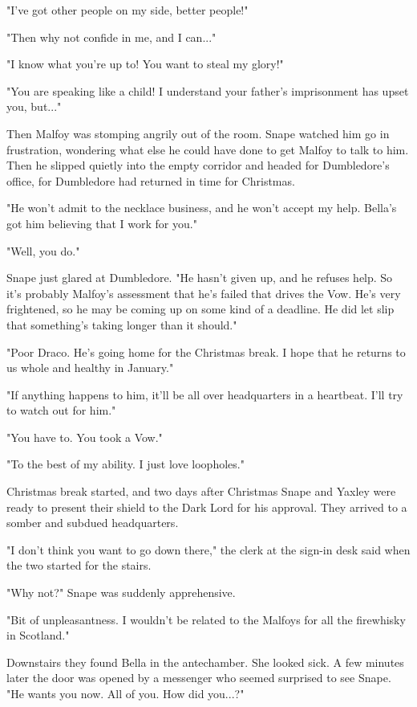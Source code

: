 \documentclass[a4paper,11pt]{article}
\begin{document}
"I've got other people on my side, better people!"

"Then why not confide in me, and I can..."

"I know what you're up to! You want to steal my glory!"

"You are speaking like a child! I understand your father's imprisonment has upset you, but..."

Then Malfoy was stomping angrily out of the room. Snape watched him go in frustration, wondering what else he could have done to get Malfoy to talk to him. Then he slipped quietly into the empty corridor and headed for Dumbledore's office, for Dumbledore had returned in time for Christmas.

"He won't admit to the necklace business, and he won't accept my help. Bella's got him believing that I work for you."

"Well, you do."

Snape just glared at Dumbledore. "He hasn't given up, and he refuses help. So it's probably Malfoy's assessment that he's failed that drives the Vow. He's very frightened, so he may be coming up on some kind of a deadline. He did let slip that something's taking longer than it should."

"Poor Draco. He's going home for the Christmas break. I hope that he returns to us whole and healthy in January."

"If anything happens to him, it'll be all over headquarters in a heartbeat. I'll try to watch out for him."

"You have to. You took a Vow."

"To the best of my ability. I just love loopholes."

Christmas break started, and two days after Christmas Snape and Yaxley were ready to present their shield to the Dark Lord for his approval. They arrived to a somber and subdued headquarters.

"I don't think you want to go down there," the clerk at the sign-in desk said when the two started for the stairs.

"Why not?" Snape was suddenly apprehensive.

"Bit of unpleasantness. I wouldn't be related to the Malfoys for all the firewhisky in Scotland."

Downstairs they found Bella in the antechamber. She looked sick. A few minutes later the door was opened by a messenger who seemed surprised to see Snape. "He wants you now. All of you. How did you...?"
\end{document}
